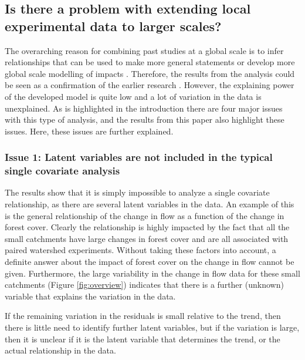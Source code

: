 \documentclass[]{elsarticle} %
\begin{document}
\hypertarget{is-there-a-problem-with-extending-local-experimental-data-to-larger-scales}{%
\subsection{Is there a problem with extending local experimental data to larger scales?}\label{is-there-a-problem-with-extending-local-experimental-data-to-larger-scales}}

The overarching reason for combining past studies at a global scale is to infer relationships that can be used to make more general statements or develop more global scale modelling of impacts \citep[i.e.][]{zhou2015, jackson2005, hoekvandijke2022}. Therefore, the results from the analysis could be seen as a confirmation of the earlier research \citep{zhang2017, filoso2017, zhou2015, jackson2005}. However, the explaining power of the developed model is quite low and a lot of variation in the data is unexplained. As is highlighted in the introduction there are four major issues with this type of analysis, and the results from this paper also highlight these issues. Here, these issues are further explained.

\hypertarget{issue-1-latent-variables-are-not-included-in-the-typical-single-covariate-analysis}{%
\subsubsection{Issue 1: Latent variables are not included in the typical single covariate analysis}\label{issue-1-latent-variables-are-not-included-in-the-typical-single-covariate-analysis}}

The results show that it is simply impossible to analyze a single covariate relationship, as there are several latent variables in the data. An example of this is the general relationship of the change in flow as a function of the change in forest cover. Clearly the relationship is highly impacted by the fact that all the small catchments have large changes in forest cover and are all associated with paired watershed experiments. Without taking these factors into account, a definite answer about the impact of forest cover on the change in flow cannot be given. Furthermore, the large variability in the change in flow data for these small catchments (Figure \ref{fig:overview}) indicates that there is a further (unknown) variable that explains the variation in the data.

If the remaining variation in the residuals is small relative to the trend, then there is little need to identify further latent variables, but if the variation is large, then it is unclear if it is the latent variable that determines the trend, or the actual relationship in the data.
\end{document}

